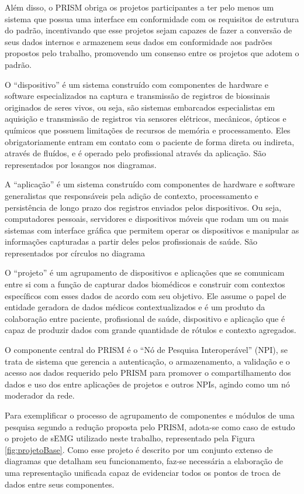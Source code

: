 Além disso, o PRISM obriga os projetos participantes a ter pelo menos um sistema que possua uma interface em conformidade com os requisitos de estrutura do padrão, incentivando que esse projetos sejam capazes de fazer a conversão de seus dados internos e armazenem seus dados em conformidade aos padrões propostos pelo trabalho, promovendo um consenso entre os projetos que adotem o padrão.

O ``dispositivo'' é um sistema construído com componentes de hardware e software especializados na captura e transmissão de registros de biossinais originados de seres vivos, ou seja, são sistemas embarcados especialistas em aquisição e transmissão de registros via sensores elétricos, mecânicos, ópticos e químicos que possuem limitações de recursos de memória e processamento. Eles obrigatoriamente entram em contato com o paciente de forma direta ou indireta, através de fluídos, e é operado pelo profissional através da aplicação. São representados por losangos nos diagramas.

A ``aplicação'' é um sistema construído com componentes de hardware e software generalistas que responsáveis pela adição de contexto, processamento e persistência de longo prazo dos registros enviados pelos dispositivos. Ou seja, computadores pessoais, servidores e dispositivos móveis que rodam um ou mais sistemas com interface gráfica que permitem operar os dispositivos e manipular as informações capturadas a partir deles pelos profissionais de saúde. São representados por círculos no diagrama

O ``projeto'' é um agrupamento de dispositivos e aplicações que se comunicam entre si com a função de capturar dados biomédicos e construir com contextos específicos com esses dados de acordo com seu objetivo. Ele assume o papel de entidade geradora de dados médicos contextualizados e é um produto da colaboração entre paciente, profissional de saúde, dispositivo e aplicação que é capaz de produzir dados com grande quantidade de rótulos e contexto agregados.

O componente central do PRISM é o ``Nó de Pesquisa Interoperável'' (NPI), se trata de sistema que gerencia a autenticação, o armazenamento, a validação e o acesso aos dados requerido pelo PRISM para promover o compartilhamento dos dados e uso dos entre aplicações de projetos e outros NPIs, agindo  como um nó moderador da rede.

Para exemplificar o processo de agrupamento de componentes e módulos de uma pesquisa segundo a redução proposta pelo PRISM, adota-se como caso de estudo o projeto de sEMG utilizado neste trabalho, representado pela Figura \ref{fig:projetoBase}. Como esse projeto é descrito por um conjunto extenso de diagramas que detalham seu funcionamento, faz-se necessária a elaboração de uma representação unificada capaz de evidenciar todos os pontos de troca de dados entre seus componentes.

